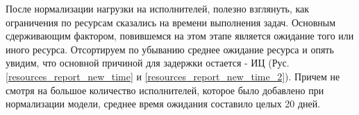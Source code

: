 После нормализации нагрузки на исполнителей, полезно
взглянуть, как ограничения по ресурсам сказались на времени
выполнения задач. Основным сдерживающим фактором, повившемся
на этом этапе является ожидание того или иного ресурса.
Отсортируем по убыванию среднее ожидание ресурса и
опять увидим, что основной причиной для задержки остается -
ИЦ (Рус. \ref{resources_report_new_time} и
\ref{resources_report_new_time_2}). Причем не смотря
на большое количество исполнителей, которое было добавлено
при нормализации модели, среднее время ожидания составило
целых 20 дней.

\clearpage
{}

